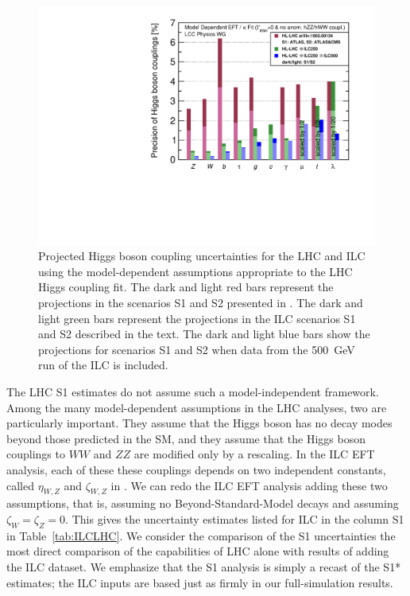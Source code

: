 \begin{figure}
\begin{center}
\includegraphics[width=0.7\hsize]{chapters/figures/DeltaHXX_SM_ILC_LHC_MD_S12.pdf}
\caption{Projected Higgs boson coupling uncertainties for the LHC and
  ILC
using the model-dependent assumptions appropriate to the LHC Higgs
coupling fit.   The
dark and light red bars represent the projections in the scenarios S1
and S2 presented in  \cite{YR}.    The dark and light green bars represent the
projections in the ILC scenarios S1 and S2 described in the
text.  The dark and light blue bars show the projections for scenarios S1 and S2
when
data from the 500~GeV run of the ILC is included.}
 \label{fig:ILCLHC}
\end{center}
\end{figure}


The LHC S1 estimates do not assume such a model-independent framework.
Among the many model-dependent assumptions in the LHC  analyses, two are
particularly important. They  assume  that the Higgs boson has no decay
modes beyond those predicted in the SM, and they  assume that the Higgs
boson couplings to $WW$ and $ZZ$ are modified only by a rescaling.  In
the ILC EFT analysis, each of these these couplings depends on two
independent constants, called $\eta_{W,Z}$ and $\zeta_{W,Z}$ in
\cite{Barklow:2017suo}.   We can redo the ILC EFT analysis
adding these two assumptions, that is, assuming no
Beyond-Standard-Model decays and assuming $\zeta_{W} = \zeta_Z = 0$.
This gives the uncertainty estimates listed for ILC  in the column S1
in Table~\ref{tab:ILCLHC}.   We consider the comparison of the S1
uncertainties the most direct comparison of the capabilities of  LHC
alone with results of adding the ILC dataset. 
  We emphasize that the S1 analysis is 
simply a recast of the S1* estimates; the ILC inputs are based just 
as firmly in our full-simulation results.

